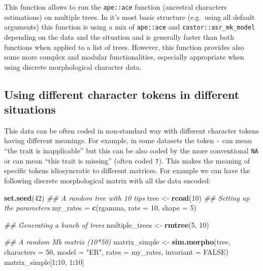 \documentclass[
]{book}
\newenvironment{Shaded}{\begin{snugshade}}{\end{snugshade}}
\newcommand{\CommentTok}[1]{\textcolor[rgb]{0.56,0.35,0.01}{\textit{#1}}}
\newcommand{\DataTypeTok}[1]{\textcolor[rgb]{0.13,0.29,0.53}{#1}}
\newcommand{\DecValTok}[1]{\textcolor[rgb]{0.00,0.00,0.81}{#1}}
\newcommand{\KeywordTok}[1]{\textcolor[rgb]{0.13,0.29,0.53}{\textbf{#1}}}
\newcommand{\NormalTok}[1]{#1}
\newcommand{\OperatorTok}[1]{\textcolor[rgb]{0.81,0.36,0.00}{\textbf{#1}}}
\newcommand{\OtherTok}[1]{\textcolor[rgb]{0.56,0.35,0.01}{#1}}
\newcommand{\StringTok}[1]{\textcolor[rgb]{0.31,0.60,0.02}{#1}}
\begin{document}
This function allows to run the \texttt{ape::ace} function (ancestral characters estimations) on multiple trees.
In it's most basic structure (e.g.~using all default arguments) this function is using a mix of \texttt{ape::ace} and \texttt{castor::asr\_mk\_model} depending on the data and the situation and is generally faster than both functions when applied to a list of trees.
However, this function provides also some more complex and modular functionalities, especially appropriate when using discrete morphological character data.

\hypertarget{using-different-character-tokens-in-different-situations}{%
\subsection{Using different character tokens in different situations}\label{using-different-character-tokens-in-different-situations}}

This data can be often coded in non-standard way with different character tokens having different meanings.
For example, in some datasets the token \texttt{-} can mean ``the trait is inapplicable'' but this can be also coded by the more conventional \texttt{NA} or can mean ``this trait is missing'' (often coded \texttt{?}).
This makes the meaning of specific tokens idiosyncratic to different matrices.
For example we can have the following discrete morphological matrix with all the data encoded:

\begin{Shaded}
\begin{Highlighting}[]
\KeywordTok{set.seed}\NormalTok{(}\DecValTok{42}\NormalTok{)}
\CommentTok{\#\# A random tree with 10 tips}
\NormalTok{tree \textless{}{-}}\StringTok{ }\KeywordTok{rcoal}\NormalTok{(}\DecValTok{10}\NormalTok{)}
\CommentTok{\#\# Setting up the parameters}
\NormalTok{my\_rates =}\StringTok{ }\KeywordTok{c}\NormalTok{(rgamma, }\DataTypeTok{rate =} \DecValTok{10}\NormalTok{, }\DataTypeTok{shape =} \DecValTok{5}\NormalTok{)}

\CommentTok{\#\# Generating a bunch of trees}
\NormalTok{multiple\_trees \textless{}{-}}\StringTok{ }\KeywordTok{rmtree}\NormalTok{(}\DecValTok{5}\NormalTok{, }\DecValTok{10}\NormalTok{)}

\CommentTok{\#\# A random Mk matrix (10*50)}
\NormalTok{matrix\_simple \textless{}{-}}\StringTok{ }\KeywordTok{sim.morpho}\NormalTok{(tree, }\DataTypeTok{characters =} \DecValTok{50}\NormalTok{, }\DataTypeTok{model =} \StringTok{"ER"}\NormalTok{, }\DataTypeTok{rates =}\NormalTok{ my\_rates,}
                            \DataTypeTok{invariant =} \OtherTok{FALSE}\NormalTok{)}
\NormalTok{matrix\_simple[}\DecValTok{1}\OperatorTok{:}\DecValTok{10}\NormalTok{, }\DecValTok{1}\OperatorTok{:}\DecValTok{10}\NormalTok{]}
\end{Highlighting}
\end{Shaded}
\end{document}
